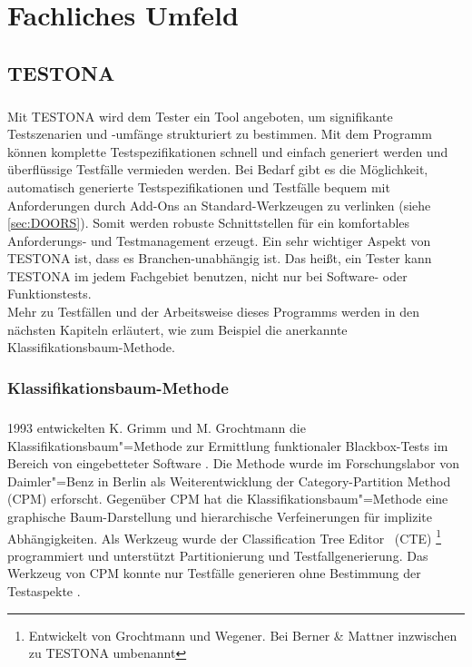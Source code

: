 \chapter{Fachliches Umfeld}\label{chp:fachlichesumfeld}

\section{TESTONA}\label{sec:Testona} 
\paragraph{}

Mit TESTONA wird dem Tester ein Tool angeboten, um signifikante Testszenarien und -umfänge strukturiert zu bestimmen. Mit dem Programm können komplette Testspezifikationen schnell und einfach generiert werden und überflüssige Testfälle vermieden werden. Bei Bedarf gibt es die Möglichkeit, automatisch generierte Testspezifikationen und Testfälle bequem mit Anforderungen durch Add-Ons an Standard-Werkzeugen zu verlinken (siehe \ref{sec:DOORS}). Somit werden robuste Schnittstellen für ein komfortables Anforderungs- und Testmanagement erzeugt. Ein sehr wichtiger Aspekt von TESTONA ist, dass es Branchen-unabhängig ist. Das heißt, ein Tester kann TESTONA im jedem Fachgebiet benutzen, nicht nur bei Software- oder Funktionstests.\\

Mehr zu Testfällen und der Arbeitsweise dieses Programms werden in den nächsten Kapiteln erläutert, wie zum Beispiel die anerkannte Klassifikationsbaum-Methode.



\subsection{Klassifikationsbaum-Methode}\label{ssec:KM}
\paragraph{}
1993 entwickelten K. Grimm und M. Grochtmann die Klassifikationsbaum"=Methode zur Ermittlung funktionaler Blackbox-Tests im Bereich von eingebetteter Software \cite{ClassificationTrees}. Die Methode wurde im Forschungslabor von Daimler"=Benz in Berlin als Weiterentwicklung der Category-Partition Method (CPM) erforscht. Gegenüber CPM hat die Klassifikationsbaum"=Methode eine graphische Baum-Darstellung und hierarchische Verfeinerungen für implizite Abhängigkeiten. Als Werkzeug wurde der \glqq Classification Tree Editor\grqq~ (CTE) \footnote{Entwickelt von Grochtmann und Wegener\cite{TestCaseDesign}. Bei Berner  \& Mattner inzwischen zu TESTONA umbenannt} programmiert und unterstützt Partitionierung und Testfallgenerierung. Das Werkzeug von CPM konnte nur Testfälle generieren ohne Bestimmung der Testaspekte \cite{CPM}.

